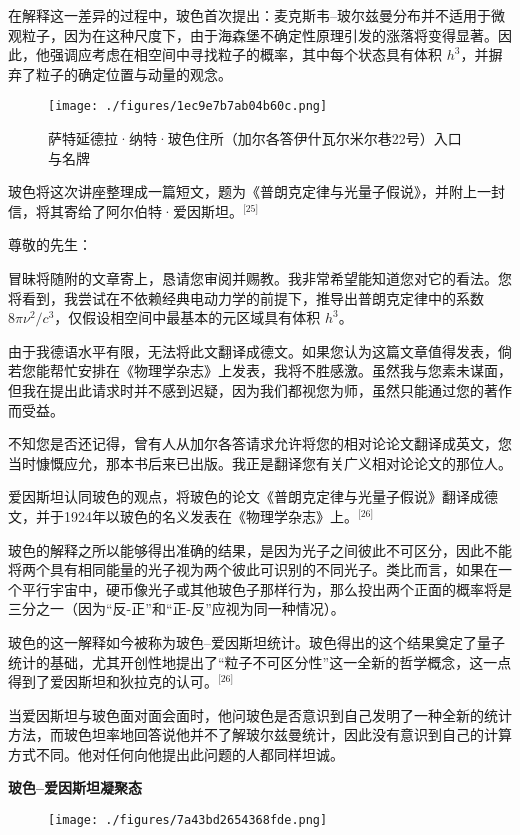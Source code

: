 在解释这一差异的过程中，玻色首次提出：麦克斯韦–玻尔兹曼分布并不适用于微观粒子，因为在这种尺度下，由于海森堡不确定性原理引发的涨落将变得显著。因此，他强调应考虑在相空间中寻找粒子的概率，其中每个状态具有体积 $h^3$，并摒弃了粒子的确定位置与动量的观念。
\begin{figure}[ht]
\centering
\texttt{[image: ./figures/1ec9e7b7ab04b60c.png]}
\caption{萨特延德拉·纳特·玻色住所（加尔各答伊什瓦尔米尔巷22号）入口与名牌} \label{fig_BOSE_2}
\end{figure}
玻色将这次讲座整理成一篇短文，题为《普朗克定律与光量子假说》，并附上一封信，将其寄给了阿尔伯特·爱因斯坦。\(^\text{[25]}\)

尊敬的先生：

冒昧将随附的文章寄上，恳请您审阅并赐教。我非常希望能知道您对它的看法。您将看到，我尝试在不依赖经典电动力学的前提下，推导出普朗克定律中的系数 $8\pi \nu^2/c^3$，仅假设相空间中最基本的元区域具有体积 $h^3$。

由于我德语水平有限，无法将此文翻译成德文。如果您认为这篇文章值得发表，倘若您能帮忙安排在《物理学杂志》上发表，我将不胜感激。虽然我与您素未谋面，但我在提出此请求时并不感到迟疑，因为我们都视您为师，虽然只能通过您的著作而受益。

不知您是否还记得，曾有人从加尔各答请求允许将您的相对论论文翻译成英文，您当时慷慨应允，那本书后来已出版。我正是翻译您有关广义相对论论文的那位人。

爱因斯坦认同玻色的观点，将玻色的论文《普朗克定律与光量子假说》翻译成德文，并于1924年以玻色的名义发表在《物理学杂志》上。\(^\text{[26]}\)

玻色的解释之所以能够得出准确的结果，是因为光子之间彼此不可区分，因此不能将两个具有相同能量的光子视为两个彼此可识别的不同光子。类比而言，如果在一个平行宇宙中，硬币像光子或其他玻色子那样行为，那么投出两个正面的概率将是三分之一（因为“反-正”和“正-反”应视为同一种情况）。

玻色的这一解释如今被称为玻色–爱因斯坦统计。玻色得出的这个结果奠定了量子统计的基础，尤其开创性地提出了“粒子不可区分性”这一全新的哲学概念，这一点得到了爱因斯坦和狄拉克的认可。\(^\text{[26]}\)

当爱因斯坦与玻色面对面会面时，他问玻色是否意识到自己发明了一种全新的统计方法，而玻色坦率地回答说他并不了解玻尔兹曼统计，因此没有意识到自己的计算方式不同。他对任何向他提出此问题的人都同样坦诚。

\textbf{玻色–爱因斯坦凝聚态}

\begin{figure}[ht]
\centering
\texttt{[image: ./figures/7a43bd2654368fde.png]}
\caption{} \label{fig_BOSE_3}
\end{figure}